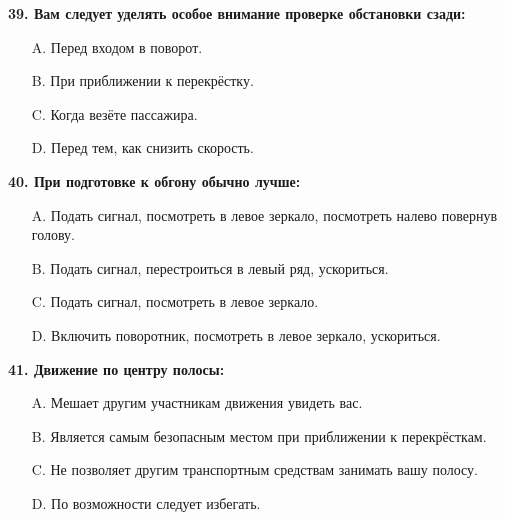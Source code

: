 \begin{minipage}{\linewidth}
\vspace{1em}\noindent\textbf{39. Вам следует уделять особое внимание проверке обстановки сзади:}

\begin{itemize}[nosep,leftmargin=2em]
\item [A.] Перед входом в поворот.
\item [B.] При приближении к перекрёстку.
\item [C.] Когда везёте пассажира.
\item [D.] Перед тем, как снизить скорость.

\end{itemize}
\end{minipage}


\begin{minipage}{\linewidth}
\vspace{1em}\noindent\textbf{40. При подготовке к обгону обычно лучше:}

\begin{itemize}[nosep,leftmargin=2em]
\item [A.] Подать сигнал, посмотреть в левое зеркало,  посмотреть налево повернув голову.
\item [B.] Подать сигнал, перестроиться в левый ряд, ускориться.
\item [C.] Подать сигнал, посмотреть в левое зеркало.
\item [D.] Включить поворотник, посмотреть в левое зеркало, ускориться.

\end{itemize}
\end{minipage}


\begin{minipage}{\linewidth}
\vspace{1em}\noindent\textbf{41. Движение по центру полосы:}

\begin{itemize}[nosep,leftmargin=2em]
\item [A.] Мешает другим участникам движения увидеть вас.
\item [B.] Является самым безопасным местом при приближении к перекрёсткам.
\item [C.] Не позволяет другим транспортным средствам занимать вашу полосу.
\item [D.] По возможности следует избегать.

\end{itemize}
\end{minipage}


